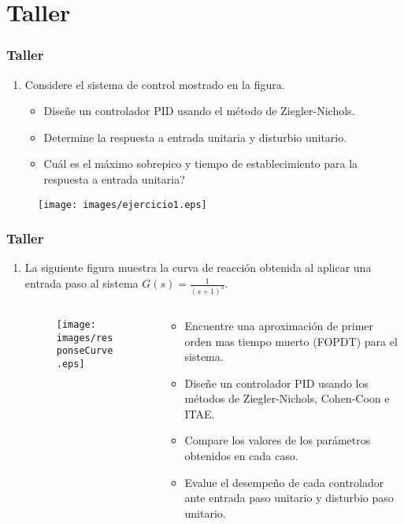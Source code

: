\documentclass[aspectratio=169]{beamer}
\theoremstyle{definition}
\theoremstyle{plain}
\theoremstyle{remark}
\newcounter{saveenumi}
\newcommand{\seti}{\setcounter{saveenumi}{\value{enumi}}}
\newcommand{\conti}{\setcounter{enumi}{\value{saveenumi}}}
\begin{document}
\section{Taller}
\begin{frame}[c]\frametitle{Taller}
	\begin{enumerate}
		\item Considere el sistema de control mostrado en la figura.
		\begin{itemize}
			\item Diseñe un controlador PID usando el método de Ziegler-Nichols.
			\item Determine la respuesta a entrada unitaria y disturbio unitario.
			\item Cuál es el máximo sobrepico y tiempo de establecimiento para la respuesta a entrada unitaria?
		\end{itemize}
		\seti
	\end{enumerate}
	\begin{figure}
		\texttt{[image: images/ejercicio1.eps]}
	\end{figure}
\end{frame}
 
\begin{frame}[c]\frametitle{Taller}
	\begin{enumerate}
		\conti
		\item La siguiente figura muestra la curva de reacción obtenida al aplicar una entrada paso al sistema $G(s) = \frac{1}{(s+1)^4}$.
		\vspace*{-5mm}
		\begin{columns}
		\begin{column}{0.5\textwidth}
		\begin{figure}
			\texttt{[image: images/responseCurve.eps]}
		\end{figure}
		\end{column}	
		\begin{column}{0.5\textwidth}
		\begin{itemize}
			\item Encuentre una aproximación de primer orden mas tiempo muerto (FOPDT) para el sistema.
			\item Diseñe un controlador PID usando los métodos de Ziegler-Nichols, Cohen-Coon e ITAE.
			\item Compare los valores de los parámetros obtenidos en cada caso.
			\item Evalue el desempeño de cada controlador ante entrada paso unitario y disturbio paso unitario.
		\end{itemize}
		\end{column}	
		\end{columns}
		\seti
	\end{enumerate}
\end{frame}
\end{document}
